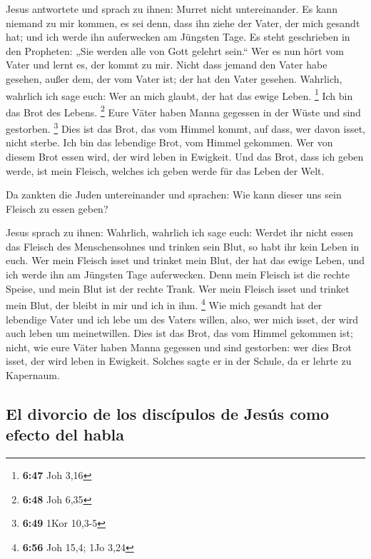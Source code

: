  Jesus antwortete und sprach zu ihnen: Murret nicht
untereinander.  Es kann niemand zu mir kommen, es sei
denn, dass ihn ziehe der Vater, der mich gesandt hat; und ich werde ihn
auferwecken am Jüngsten Tage.  Es steht geschrieben in
den Propheten: „Sie werden alle von Gott gelehrt sein.`` Wer es nun hört
vom Vater und lernt es, der kommt zu mir.  Nicht dass
jemand den Vater habe gesehen, außer dem, der vom Vater ist; der hat den
Vater gesehen.  Wahrlich, wahrlich ich sage euch: Wer an
mich glaubt, der hat das ewige Leben. \footnote{\textbf{6:47} Joh 3,16}
 Ich bin das Brot des Lebens. \footnote{\textbf{6:48} Joh
  6,35}  Eure Väter haben Manna gegessen in der Wüste und
sind gestorben. \footnote{\textbf{6:49} 1Kor 10,3-5} 
Dies ist das Brot, das vom Himmel kommt, auf dass, wer davon isset,
nicht sterbe.  Ich bin das lebendige Brot, vom Himmel
gekommen. Wer von diesem Brot essen wird, der wird leben in Ewigkeit.
Und das Brot, dass ich geben werde, ist mein Fleisch, welches ich geben
werde für das Leben der Welt.

 Da zankten die Juden untereinander und sprachen: Wie
kann dieser uns sein Fleisch zu essen geben?

 Jesus sprach zu ihnen: Wahrlich, wahrlich ich sage euch:
Werdet ihr nicht essen das Fleisch des Menschensohnes und trinken sein
Blut, so habt ihr kein Leben in euch.  Wer mein Fleisch
isset und trinket mein Blut, der hat das ewige Leben, und ich werde ihn
am Jüngsten Tage auferwecken.  Denn mein Fleisch ist die
rechte Speise, und mein Blut ist der rechte Trank.  Wer
mein Fleisch isset und trinket mein Blut, der bleibt in mir und ich in
ihm. \footnote{\textbf{6:56} Joh 15,4; 1Jo 3,24}  Wie
mich gesandt hat der lebendige Vater und ich lebe um des Vaters willen,
also, wer mich isset, der wird auch leben um meinetwillen.
 Dies ist das Brot, das vom Himmel gekommen ist; nicht,
wie eure Väter haben Manna gegessen und sind gestorben: wer dies Brot
isset, der wird leben in Ewigkeit.  Solches sagte er in
der Schule, da er lehrte zu Kapernaum.

\hypertarget{el-divorcio-de-los-discuxedpulos-de-jesuxfas-como-efecto-del-habla}{%
\subsection{El divorcio de los discípulos de Jesús como efecto del
habla}\label{el-divorcio-de-los-discuxedpulos-de-jesuxfas-como-efecto-del-habla}}

